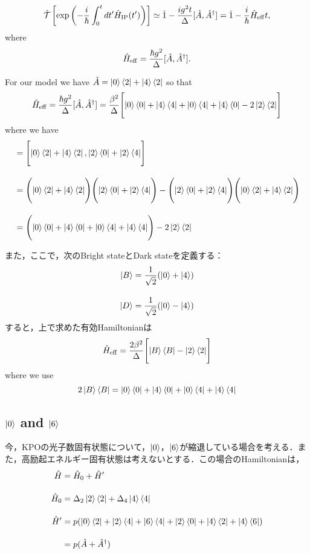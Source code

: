 \begin{equation}
    \hat{\mathcal{T}}\left[
    \exp{\left(
    -\frac{i}{\hbar}\int_0^t dt^\prime \hat{H}_{\rm{IP}}(t^\prime)
    \right)}
    \right]
    \simeq
    \hat{1}-\frac{ig^2t}{\Delta}[\hat{A},\hat{A}^\dagger]
    =\hat{1}-\frac{i}{\hbar}\hat{H}_{\rm{eff}}t,
\end{equation}
where
\begin{equation}
    \hat{H}_{\rm{eff}}=\frac{\hbar g^2}{\Delta}[\hat{A},\hat{A}^\dagger].
\end{equation}

For our model we have $\hat{A}=\ket{0}\bra{2} + \ket{4}\bra{2}$ so that
\begin{equation}
    \hat{H}_{\rm{eff}}=\frac{\hbar g^2}{\Delta}[\hat{A},\hat{A}^\dagger]
    =\frac{\beta^2}{\Delta}
    \Biggl[
    \ket{0}\bra{0} + \ket{4}\bra{4} + \ket{0}\bra{4} + \ket{4}\bra{0} -2 \ket{2}\bra{2}
    \Biggr]
\end{equation}
where we have
\begin{align}
    [\hat{A}, \hat{A}^\dagger]
    &=\Biggl[\ket{0}\bra{2} + \ket{4}\bra{2},\ket{2}\bra{0} + \ket{2}\bra{4}\Biggr]\nn[10pt]
    &=\Biggl(
    \ket{0}\bra{2} + \ket{4}\bra{2}
    \Biggr)
    \Biggl(
    \ket{2}\bra{0} + \ket{2}\bra{4}
    \Biggr)
    -
    \Biggl(
    \ket{2}\bra{0} + \ket{2}\bra{4}
    \Biggr)
    \Biggl(
    \ket{0}\bra{2} + \ket{4}\bra{2}
    \Biggr)
    \nn[10pt]
    &=\Biggl(
    \ket{0}\bra{0} + \ket{4}\bra{0}
    +\ket{0}\bra{4} + \ket{4}\bra{4}
    \Biggr)
    -
    2\ket{2}\bra{2}
\end{align}


また，ここで，次のBright stateとDark stateを定義する：
\begin{align}
    \ket{B} &= \frac{1}{\sqrt{2}}(\ket{0} + \ket{4})\\[10pt]
    \ket{D} &= \frac{1}{\sqrt{2}}(\ket{0} - \ket{4})
\end{align}
すると，上で求めた有効Hamiltonianは
\begin{equation}
    \hat{H}_{\rm{eff}}
    =\frac{2\beta^2}{\Delta}
    \Biggl[
    \ket{B}\bra{B} - \ket{2}\bra{2}
    \Biggr]
\end{equation}
where we use
\begin{equation}
    2\ket{B}\bra{B}
    =\ket{0}\bra{0} + \ket{4}\bra{0}
    +\ket{0}\bra{4} + \ket{4}\bra{4}
\end{equation}

\subsection{$\ket{0}$ and $\ket{6}$}
今，KPOの光子数固有状態について，$\ket{0}$，$\ket{6}$が縮退している場合を考える．また，高励起エネルギー固有状態は考えないとする．この場合のHamiltonianは，
\begin{align}
    \hat{H} &= \hat{H}_0 + \hat{H}^{\prime}\\[10pt]
    \hat{H}_0 &= \Delta_2 \ket{2}\bra{2} + \Delta_4 \ket{4}\bra{4}\nn[10pt]
    \hat{H}^{\prime} &
    = p(\ket{0}\bra{2} + \ket{2}\bra{4} + \ket{6}\bra{4} + \ket{2}\bra{0} + \ket{4}\bra{2} + \ket{4}\bra{6})\nn[10pt]
    &= p(\hat{A} + \hat{A}^{\dagger})
\end{align}


